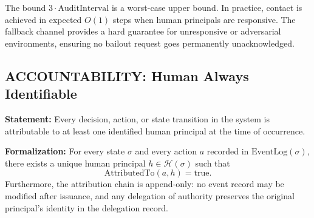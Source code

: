 \begin{block}
The bound $3 \cdot \text{AuditInterval}$ is a worst-case upper bound. In practice, contact is achieved in expected $O(1)$ steps when human principals are responsive. The fallback channel provides a hard guarantee for unresponsive or adversarial environments, ensuring no bailout request goes permanently unacknowledged.
\end{block}

\subsection{ACCOUNTABILITY: Human Always Identifiable}

\begin{block}
\textbf{Statement:} Every decision, action, or state transition in the system is attributable to at least one identified human principal at the time of occurrence.

\textbf{Formalization:} For every state $\sigma$ and every action $a$ recorded in $\text{EventLog}(\sigma)$, there exists a unique human principal $h \in \mathcal{H}(\sigma)$ such that
\[
\text{AttributedTo}(a, h) = \text{true}.
\]
Furthermore, the attribution chain is append-only: no event record may be modified after issuance, and any delegation of authority preserves the original principal's identity in the delegation record.
\end{block}

